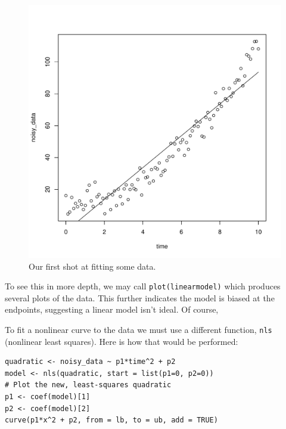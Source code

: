 \documentclass[12pt]{article}
\theoremstyle{remark}
\begin{document}
\begin{figure}[htbp]
\centering
\includegraphics[scale=0.5]{linear_model}
\caption{Our first shot at fitting some data.}
\label{linear}
\end{figure}

To see this in more depth, we may call \verb|plot(linearmodel)| which produces several plots of the data. This further indicates the model is biased at the endpoints, suggesting a linear model isn't ideal. Of course, 

To fit a nonlinear curve to the data we must use a different function, \verb|nls| (nonlinear least squares). Here is how that would be performed:
\begin{Verbatim}[frame=single, fontsize=\small]
quadratic <- noisy_data ~ p1*time^2 + p2
model <- nls(quadratic, start = list(p1=0, p2=0))
# Plot the new, least-squares quadratic
p1 <- coef(model)[1]
p2 <- coef(model)[2]
curve(p1*x^2 + p2, from = lb, to = ub, add = TRUE)
\end{Verbatim}

\end{document}
